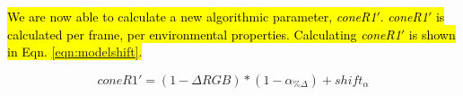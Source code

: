 \documentclass[12pt]{report}
\begin{document}
\hl{We are now able to calculate a new algorithmic parameter, \textit{coneR1}$'$. \textit{coneR1}$'$ is calculated per frame, per environmental properties.
Calculating \textit{coneR1}$'$ is shown in Eqn. \ref{eqn:modelshift}.}

\begin{equation}
coneR1' = (1 - \Delta RGB)*(1 - \alpha_{\%\Delta}) + shift_{\alpha}
\label{eqn:modelshift}
\end{equation}
\end{document}

